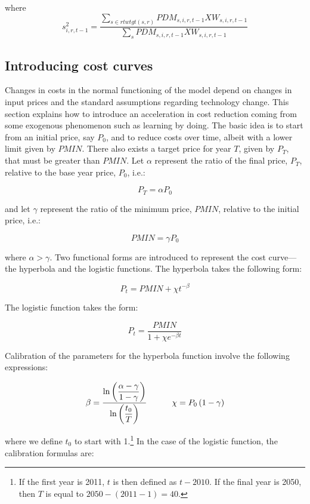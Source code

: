 \documentclass[11pt,letterpaper]{report}
\begin{document}
\noindent where
\[
s^{\mathit{2}}_{i,r,t-1} =
   \frac{\sum_{s \in {\mathit{rtwtgt}(s,r)}}
      {\mathit{PDM}_{s,i,r,t-1}\mathit{XW}_{s,i,r,t-1}}}
      {\sum_{s}{\mathit{PDM}_{s,i,r,t-1}\mathit{XW}_{s,i,r,t-1}}}
\]

\subsection{Introducing cost curves}

Changes in costs in the normal functioning of the model depend on changes in
input prices and the standard assumptions regarding technology change. This
section explains how to introduce an acceleration in cost reduction coming from
some exogenous phenomenon such as learning by doing. The basic idea is to start
from an initial price, say $P_0$, and to reduce costs over time, albeit with a
lower limit given by $\mathit{PMIN}$. There also exists a target price for year
$T$, given by $P_T$, that must be greater than $\mathit{PMIN}$. Let $\alpha$
represent the ratio of the final price, $P_T$, relative to the base year price,
$P_0$, i.e.:

\[
P_T=\alpha P_0
\]

\noindent and let $\gamma$ represent the ratio of the minimum price,
$\mathit{PMIN}$, relative to the initial price, i.e.:

\[
\mathit{PMIN}=\gamma P_0
\]

\noindent where $\alpha > \gamma$. Two functional forms are introduced to
represent the cost curve---the hyperbola and the logistic functions. The
hyperbola takes the following form:

\[
P_t = \mathit{PMIN} + \chi t^{-\beta}
\]

\noindent The logistic function takes the form:

\[
P_t = \frac{\mathit{PMIN}} {1+\chi e^{-\beta t}}
\]

Calibration of the parameters for the hyperbola function involve the following
expressions:

\[
\begin{array}{c c}
\beta = \displaystyle \frac{\ln\left(\displaystyle
   \frac{\alpha-\gamma}{1-\gamma}\right)}
      {\ln\left(\displaystyle \frac{t_0}{T}\right)}
&  \qquad \chi = P_0\left(1-\gamma\right) \\
\end{array}
\]

\noindent where we define $t_0$ to start with 1.\footnote{If the first year is
2011, $t$ is then defined as $t-2010$. If 	the final year is 2050, then $T$ is
equal to $2050 - (2011-1)=40$.} In the case of the logistic function, the
calibration formulas are:
\end{document}
